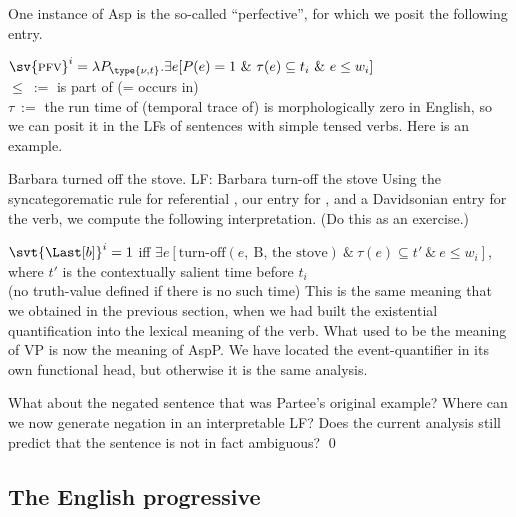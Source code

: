 \kwn{}%
One instance of Asp is the so-called ``perfective'', for which we posit the
following entry.

\ex $\sv{\pfv}^{i} = \lambda P_{\type{\nu,t}}.\exists e [P(e) = 1\ \&\
\tau(e) \subseteq t_{i}\ \&\ e \le w_{i}]$\\
\hfill $\le\ :=$ is part of (= occurs in)\\
\hfill $\tau\ :=$ the run time of (temporal trace of)
\xe
%
\pfv is morphologically zero in English, so we can posit it in the LFs of
sentences with simple tensed verbs. Here is an example.

\pex
\a Barbara turned off the stove.
\a LF: \lb[TP] \past \lb[AspP] \pfv \lb[VP] Barbara turn-off the stove \rb \rb
\rb \xe
%
Using the syncategorematic rule  for referential \past, our
entry \LLast for \pfv, and a Davidsonian entry for the verb, we compute the
following interpretation. (Do this as an exercise.)

\ex $\svt{\Last[b]}^{i} = 1$ iff $\exists e [\text{turn-off}(e,\ \text{B,
  the stove})\ \& \ \tau(e) \subseteq t'\ \&\ e \le w_{i}]$,\\
\hfill where $t'$ is the contextually salient time before $t_{i}$\\
\hfill (no truth-value defined if there is no such time)
\xe
%
This is the same meaning that we obtained in the previous section, when we had
built the existential quantification into the lexical meaning of the verb. What
used to be the meaning of VP is now the meaning of AspP. We have located the
event-quantifier in its own functional head, but otherwise it is the same
analysis.

\begin{exercise}
  What about the negated sentence that was Partee's original example? Where can
  we now generate negation in an interpretable LF? Does the current analysis
  still predict that the sentence is not in fact ambiguous? \qed
\end{exercise}

\subsection{The English progressive}
\label{sec:progressive}

